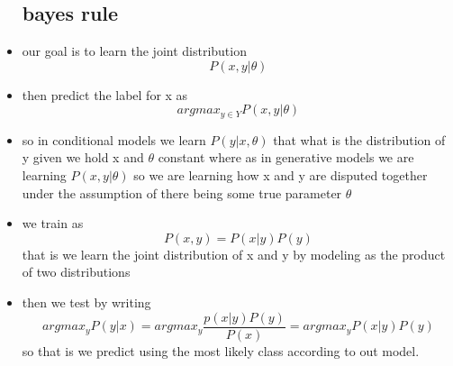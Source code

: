 \documentclass{article}
\begin{document}
\begin{itemize}
\subsection*{bayes rule}
\item our goal is to learn the joint distribution $$P(x,y|\theta)$$ 
\item then predict the label for x as $$argmax_{y\in Y}P(x,y|\theta)$$
\item so in conditional models we learn $P(y|x,\theta)$ that what is the distribution of y given we hold x and $\theta$ constant where as in generative models we are learning $P(x,y|\theta)$ so we are learning how x and y are disputed together under the assumption of there being some true parameter $\theta$
\item we train as $$P(x,y)=P(x|y)P(y)$$ that is we learn the joint distribution of x and y by modeling as the product of two distributions
\item then we test by writing $$argmax_{y}P(y|x)=argmax_{y}\frac{p(x|y)P(y)}{P(x)}=argmax_y P(x|y)P(y)$$ so that is we predict using the most likely class according to out model.

\end{itemize}
\end{document}
